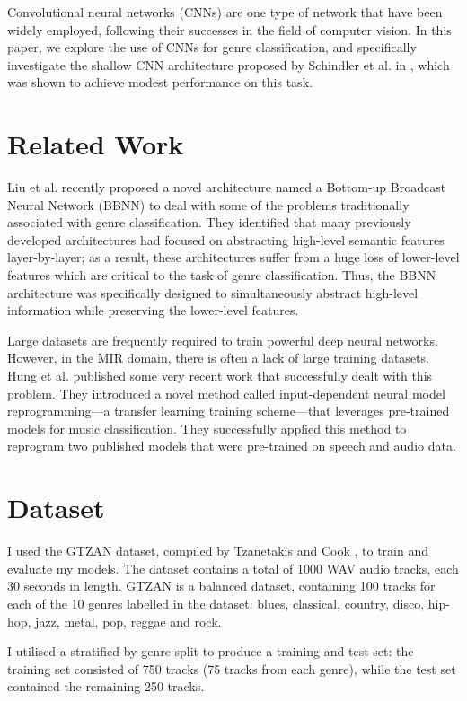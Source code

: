 \documentclass[conference]{IEEEtran}
\begin{document}
Convolutional neural networks (CNNs) are one type of network that have been widely employed, following their successes in the field of computer vision.
In this paper, we explore the use of CNNs for genre classification, and specifically investigate the shallow CNN architecture proposed by Schindler et al. in \cite{SchindlerLidyRauber}, which was shown to achieve modest performance on this task.

\section{Related Work}

Liu et al. \cite{LiuFengLiuWangLiu} recently proposed a novel architecture named a Bottom-up Broadcast Neural Network (BBNN) to deal with some of the problems traditionally associated with genre classification.
They identified that many previously developed architectures had focused on abstracting high-level semantic features layer-by-layer; as a result, these architectures suffer from a huge loss of lower-level features which are critical to the task of genre classification.
Thus, the BBNN architecture was specifically designed to simultaneously abstract high-level information while preserving the lower-level features.

Large datasets are frequently required to train powerful deep neural networks.
However, in the MIR domain, there is often  a lack of large training datasets.
Hung et al. \cite{HungYangChenLerch} published some very recent work that successfully dealt with this problem.
They introduced a novel method called input-dependent neural model reprogramming---a transfer learning training scheme---that leverages pre-trained models for music classification.
They successfully applied this method to reprogram two published models that were pre-trained on speech and audio data.

\section{Dataset}

I used the GTZAN dataset, compiled by Tzanetakis and Cook \cite{TzanetakisCook}, to train and evaluate my models.
The dataset contains a total of 1000 WAV audio tracks, each 30 seconds in length.
GTZAN is a balanced dataset, containing 100 tracks for each of the 10 genres labelled in the dataset: blues, classical, country, disco, hip-hop, jazz, metal, pop, reggae and rock.

I utilised a stratified-by-genre split to produce a training and test set: the training set consisted of 750 tracks (75 tracks from each genre), while the test set contained the remaining 250 tracks.
\end{document}
